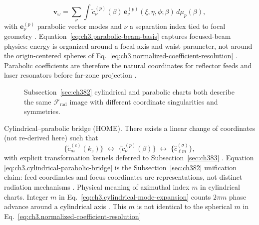 \begin{equation}
\label{eq:ch3.parabolic-beam-basis}
\mathbf{v}_\omega
=
\sum_{\nu}
\int
\widetilde{c}_{\nu}^{(p)}(\beta)\,
\mathbf{e}_{\nu}^{(p)}(\xi,\eta,\phi;\beta)\,d\mu_{p}(\beta),
\end{equation}
with \(\mathbf{e}_{\nu}^{(p)}\) parabolic vector modes and \(\nu\) a separation index tied to focal geometry
\cite{stratton1941}. Equation~\eqref{eq:ch3.parabolic-beam-basis} captures focused-beam physics: energy is organized
around a focal axis and waist parameter, not around the origin-centered spheres of Eq.~\eqref{eq:ch3.normalized-coefficient-resolution}
\cite{harrington2001}. Parabolic coefficients are therefore the natural coordinates for reflector feeds and laser
resonators before far-zone projection \cite{stratton1941}.
\begin{figure}[t]
\centering
{}
\caption{Subsection~\ref{sec:ch382} cylindrical and parabolic charts both describe the same \(\mathcal{F}_{\mathrm{rad}}\) image with different
coordinate singularities and symmetries.}
\label{fig:ch3.382-dual-charts}
\end{figure}
Cylindrical--parabolic bridge (HOME). There exists a linear change of coordinates (not re-derived here) such that
\begin{equation}
\label{eq:ch3.cylindrical-parabolic-bridge}
\{\widetilde{c}_{m}^{(c)}(k_{z})\}
\;\longleftrightarrow\;
\{\widetilde{c}_{\nu}^{(p)}(\beta)\}
\;\longleftrightarrow\;
\{\widehat{c}_{\ell m}^{(\sigma)}\},
\end{equation}
with explicit transformation kernels deferred to Subsection~\ref{sec:ch383} \cite{hansen1988}. Equation
\eqref{eq:ch3.cylindrical-parabolic-bridge} is the Subsection~\ref{sec:ch382} unification claim: feed coordinates and focus coordinates are
representations, not distinct radiation mechanisms \cite{harrington2001}.
Physical meaning of azimuthal index \(m\) in cylindrical charts. Integer \(m\) in Eq.~\eqref{eq:ch3.cylindrical-mode-expansion} counts \(2\pi m\) phase advance around a cylindrical axis
\cite{jackson1999}. This \(m\) is not identical to the spherical \(m\) in Eq.~\eqref{eq:ch3.normalized-coefficient-resolution}

